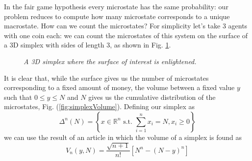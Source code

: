 In the fair game hypothesis every microstate has the same probability: our problem reduces to compute how many microstate corresponds to a unique macrostate.
How can we count the microstates?
For simplicity let's take 3 agents with one coin each: we can count the microstates of this system on the surface of a 3D simplex with sides of length 3, as shown in Fig. \ref{fig:threeSimplex}.
\begin{figure}[ht!]
    \centering
    \caption{\emph{A 3D simplex where the surface of interest is enlightened.}}
    \label{fig:threeSimplex}
\end{figure}
It is clear that, while the surface gives us the number of microstates corresponding to a fixed amount of money, the volume between a fixed value $y$ such that $0 \leq y \leq N$ and $N$ gives us the cumulative distribution of the microstates, Fig. (\ref{fig:simplexVolume}).
Defining our simplex as
\begin{equation*}
    \Delta^n(N)=\left\{x \in \mathbb{R}^n \text{ s.t. } \sum_{i = 1}^n x_i = N, x_i \geq 0\right\}
\end{equation*}
we can use the result of an article \cite{simplexSampling} in which the volume of a simplex is found as
\begin{equation}
    V_n\left(y, N\right) = \frac{\sqrt{n+1}}{n!}\left[N^n - \left(N - y\right)^n\right]
\end{equation}
